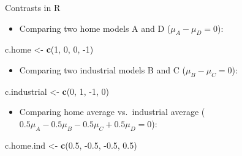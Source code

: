 \documentclass[ignorenonframetext,]{beamer}
\newenvironment{Shaded}{\begin{snugshade}}{\end{snugshade}}
\newcommand{\DecValTok}[1]{\textcolor[rgb]{0.00,0.00,0.81}{#1}}
\newcommand{\FloatTok}[1]{\textcolor[rgb]{0.00,0.00,0.81}{#1}}
\newcommand{\KeywordTok}[1]{\textcolor[rgb]{0.13,0.29,0.53}{\textbf{#1}}}
\newcommand{\NormalTok}[1]{#1}
\newcommand{\StringTok}[1]{\textcolor[rgb]{0.31,0.60,0.02}{#1}}
\providecommand{\tightlist}{%
  \setlength{\itemsep}{0pt}\setlength{\parskip}{0pt}}
\begin{document}
\begin{frame}[fragile]{Contrasts in R}
\protect\hypertarget{contrasts-in-r}{}

\begin{itemize}
\tightlist
\item
  Comparing two home models A and D (\(\mu_A-\mu_D=0\)):
\end{itemize}

\begin{Shaded}
\begin{Highlighting}[]
\NormalTok{c.home <-}\StringTok{ }\KeywordTok{c}\NormalTok{(}\DecValTok{1}\NormalTok{, }\DecValTok{0}\NormalTok{, }\DecValTok{0}\NormalTok{, }\DecValTok{-1}\NormalTok{)}
\end{Highlighting}
\end{Shaded}

\begin{itemize}
\tightlist
\item
  Comparing two industrial models B and C (\(\mu_B-\mu_C=0\)):
\end{itemize}

\begin{Shaded}
\begin{Highlighting}[]
\NormalTok{c.industrial <-}\StringTok{ }\KeywordTok{c}\NormalTok{(}\DecValTok{0}\NormalTok{, }\DecValTok{1}\NormalTok{, }\DecValTok{-1}\NormalTok{, }\DecValTok{0}\NormalTok{)}
\end{Highlighting}
\end{Shaded}

\begin{itemize}
\tightlist
\item
  Comparing home average vs.~industrial average
  (\(0.5\mu_A-0.5\mu_B-0.5\mu_C+0.5\mu_D=0\)):
\end{itemize}

\begin{Shaded}
\begin{Highlighting}[]
\NormalTok{c.home.ind <-}\StringTok{ }\KeywordTok{c}\NormalTok{(}\FloatTok{0.5}\NormalTok{, }\FloatTok{-0.5}\NormalTok{, }\FloatTok{-0.5}\NormalTok{, }\FloatTok{0.5}\NormalTok{)}
\end{Highlighting}
\end{Shaded}

\end{frame}
\end{document}
